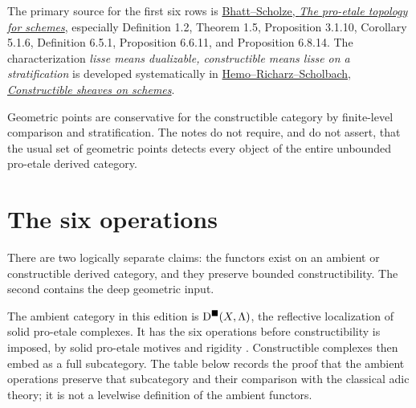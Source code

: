 The primary source for the first six rows is
\href{https://people.mpim-bonn.mpg.de/scholze/proetale.pdf}
{Bhatt--Scholze, \emph{The pro-etale topology for schemes}},
especially Definition 1.2, Theorem 1.5, Proposition 3.1.10,
Corollary 5.1.6, Definition 6.5.1, Proposition 6.6.11, and
Proposition 6.8.14.  The characterization
\emph{lisse means dualizable, constructible means lisse on a
stratification} is developed systematically in
\href{https://arxiv.org/abs/2305.18131}
{Hemo--Richarz--Scholbach, \emph{Constructible sheaves on schemes}}.

\begin{warning}
Geometric points are conservative for the constructible category by
finite-level comparison and stratification.  The notes do not require, and
do not assert, that the usual set of geometric points detects every object
of the entire unbounded pro-etale derived category.
\end{warning}

\section{The six operations}

There are two logically separate claims: the functors exist on an ambient or
constructible derived category, and they preserve bounded constructibility.
The second contains the deep geometric input.

\begin{foundation}[title={Active architecture: Route B}]
The ambient category in this edition is
\(\mathrm D^{\blacksquare}(X,\Lambda)\), the reflective localization of solid pro-etale
complexes.  It has the six operations before constructibility is imposed,
by solid pro-etale motives and rigidity
\cite[Theorem~3.3.7]{RuimyTubachWolfSolid}.  Constructible complexes then
embed as a full subcategory.  The table below records the proof that the
ambient operations preserve that subcategory and their comparison with the
classical adic theory; it is not a levelwise definition of the ambient
functors.
\end{foundation}


